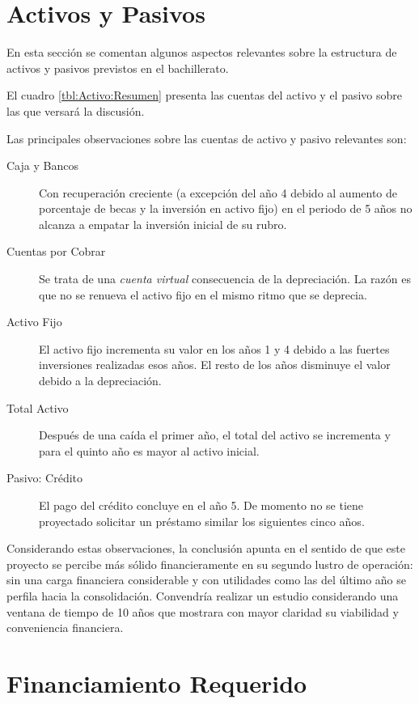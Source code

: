 

\section{Activos y Pasivos}
\label{sec:ActivosPasivos}

En esta sección se comentan algunos aspectos relevantes sobre la estructura de activos y pasivos previstos en el bachillerato.

El cuadro \ref{tbl:Activo:Resumen} presenta las cuentas del activo y el pasivo sobre las que versará la discusión.

Las principales observaciones sobre las cuentas de activo y pasivo relevantes son:

\begin{description}
	\item[Caja y Bancos] Con recuperación creciente (a excepción del año 4 debido al aumento de porcentaje de becas y la inversión en activo fijo) en el periodo de 5 años no alcanza a empatar la inversión inicial de su rubro.
	\item[Cuentas por Cobrar] Se trata de una \emph{cuenta virtual} consecuencia de la depreciación. La razón es que no se renueva el activo fijo en el mismo ritmo que se deprecia.
	\item[Activo Fijo] El activo fijo incrementa su valor en los años 1 y 4 debido a las fuertes inversiones realizadas esos años. El resto de los años disminuye el valor debido a la depreciación.
	\item[Total Activo] Después de una caída el primer año, el total del activo se incrementa y para el quinto año es mayor al activo inicial.
	\item[Pasivo: Crédito] El pago del crédito concluye en el año 5. De momento no se tiene proyectado solicitar un préstamo similar los siguientes cinco años.
\end{description}

Considerando estas observaciones, la conclusión apunta en el sentido de que este proyecto se percibe más sólido financieramente en su segundo lustro de operación: sin una carga financiera considerable y con utilidades como las del último año se perfila hacia la consolidación. Convendría realizar un estudio considerando una ventana de tiempo de 10 años que mostrara con mayor claridad su viabilidad y conveniencia financiera.



\section{Financiamiento Requerido}
\label{sec:Financiamiento}

